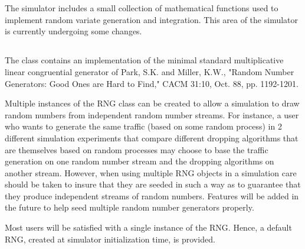 %
%
\section{}

The simulator includes a small collection of mathematical
functions used to implement random variate generation and integration.
This area of the simulator is currently undergoing some
changes.

\subsection{}

The  class contains an implementation of the minimal standard
multiplicative linear congruential generator of Park, S.K. and
Miller, K.W., "Random Number Generators: Good Ones are Hard to Find,"
CACM 31:10, Oct. 88, pp. 1192-1201.

Multiple instances of the RNG class can be created to allow a
simulation to draw random numbers from independent random number
streams.  For instance, a user who wants to generate the same traffic
(based on some random process) in 2 different simulation experiments
that compare different dropping algorithms that are themselves based
on random processes may choose to base the traffic generation on one
random number stream and the dropping algorithms on another stream.
However, when using multiple RNG objects in a simulation care should
be taken to insure that they are seeded in such a way as to guarantee
that they produce independent streams of random numbers.  Features
will be added in the future to help seed multiple random number
generators properly.

Most users will be satisfied with a single instance of the RNG.
Hence, a default RNG, created at simulator initialization time, is
provided.

